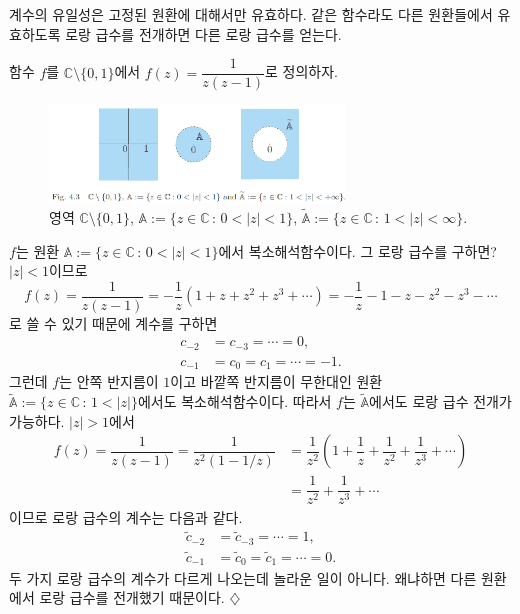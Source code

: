 계수의 유일성은 고정된 원환에 대해서만 유효하다.
같은 함수라도 다른 원환들에서 유효하도록 로랑 급수를 전개하면
다른 로랑 급수를 얻는다.

\begin{salt_example} \label{example-4-12}

함수 $f$를 $\mathbb C\setminus\{0,1\}$에서
$f(z) = \dfrac1{z(z-1)}$로 정의하자. 

\begin{figure}[h!]
\begin{center}
\includegraphics[width=0.7\textwidth]{./SaltChapter/fig-4-3}
\end{center}
\caption{영역 $\mathbb C\setminus \{0,1\}$,
$\mathbb A:=\{ z\in \mathbb C\,:\, 0<|z|<1 \}$,
$\tilde {\mathbb A}:=\{ z\in \mathbb C\,:\, 1<|z|<\infty \}$.}
\label{fig-4-3}
\end{figure}
$f$는 원환 $\mathbb A:=\{ z\in \mathbb C\,:\, 0<|z|<1 \}$에서
복소해석함수이다. 그 로랑 급수를 구하면?
$|z|<1$이므로
\[
f(z) = \dfrac1{z(z-1)} %
= - \dfrac1z \left(1+z+z^2+ z^3 + \cdots \right)
= -\dfrac1z -1 -z -z^2 -z^3 - \cdots
\]
로 쓸 수 있기 때문에
계수를 구하면
\begin{align*}
c_{-2} &= c_{-3} = \cdots = 0, \\
c_{-1} & = c_0 = c_1 = \cdots = -1.
\end{align*}
그런데 $f$는 안쪽 반지름이 $1$이고 바깥쪽 반지름이 무한대인
원환 $\tilde{\mathbb A}:=\{ z\in \mathbb C\,:\, 1<|z| \}$에서도
복소해석함수이다. 따라서
$f$는 $\tilde{\mathbb A}$에서도 로랑 급수 전개가 가능하다.
$|z|>1$에서
\begin{align*}
f(z) = \dfrac1{z(z-1)} = \dfrac1{z^2(1-1/z)}
&= \dfrac1{z^2} \left( 1+ \dfrac1z + \dfrac1{z^2} + \dfrac1{z^3} + \cdots \right) \\
&= \dfrac 1{z^2} + \dfrac1{z^3} + \cdots
\end{align*}
이므로 로랑 급수의 계수는 다음과 같다.
\begin{align*}
\tilde c_{-2} &= \tilde c_{-3} = \cdots = 1, \\
\tilde c_{-1} & = \tilde c_0 = \tilde c_1 = \cdots = 0.
\end{align*}
두 가지 로랑 급수의 계수가 다르게 나오는데 놀라운 일이 아니다.
왜냐하면 다른 원환에서 로랑 급수를 전개했기 때문이다.
\hfill $\diamondsuit$
\end{salt_example}

